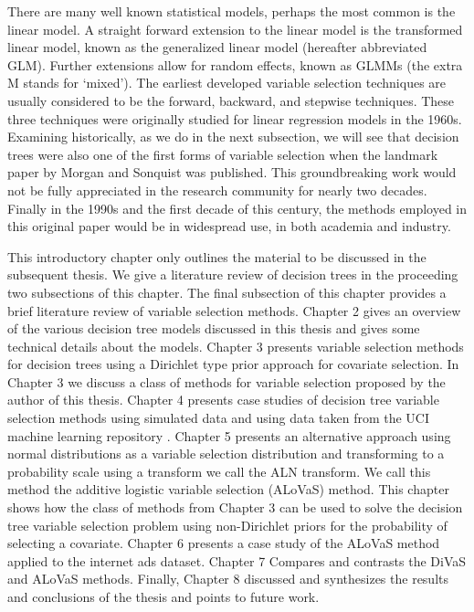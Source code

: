 There are many well known statistical models, perhaps the most common is the linear model. A straight forward extension to the linear model is the transformed linear model, known as the generalized linear model (hereafter abbreviated GLM).  Further extensions allow for random effects, known as GLMMs (the extra M stands for `mixed'). The earliest developed variable selection techniques are usually considered to be the forward, backward, and stepwise techniques. These three techniques were originally studied for linear regression models in the 1960s. Examining historically, as we do in the next subsection, we will see that decision trees were also one of the first forms of variable selection when the landmark paper by Morgan and Sonquist \cite{morgan1963problems} was published. This groundbreaking work would not be fully appreciated in the research community for nearly two decades. Finally in the 1990s and the first decade of this century, the methods employed in this original paper would be in widespread use, in both academia and industry. 

This introductory chapter only outlines the material to be discussed in the subsequent thesis. We give a literature review of decision trees in the proceeding two subsections of this chapter. The final subsection of this chapter provides a brief literature review of variable selection methods. Chapter 2 gives an overview of the various decision tree models discussed in this thesis and gives some technical details about the models. Chapter 3 presents variable selection methods for decision trees using a Dirichlet type prior approach for covariate selection. In Chapter 3 we discuss a class of methods for variable selection proposed by the author of this thesis. Chapter 4 presents case studies of decision tree variable selection methods using simulated data and using data taken from the UCI machine learning repository \cite{Frank:2010uq}. Chapter 5 presents an alternative approach using normal distributions as a variable selection distribution and transforming to a probability scale using a transform we call the ALN transform. We call this method the additive logistic variable selection (ALoVaS) method. 
This chapter shows how the class of methods from Chapter 3 can be used to solve the decision tree variable selection problem using non-Dirichlet priors for the probability of selecting a covariate. Chapter 6 presents a case study of the ALoVaS method applied to the internet ads dataset. Chapter 7 Compares  and contrasts the DiVaS and ALoVaS methods. Finally, Chapter 8 discussed and synthesizes the results and conclusions of the thesis and points to future work. %

